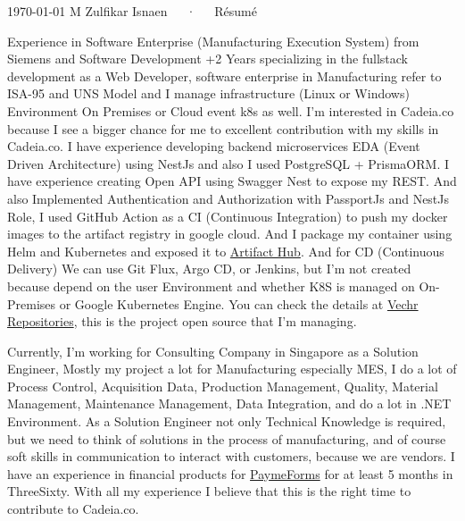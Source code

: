 \documentclass[10pt, a4paper]{awesome-cv}
\begin{document}
\makecvheader[R]

\makecvfooter
  {\today}
  {M Zulfikar Isnaen~~~·~~~Résumé}
  {}

\makelettertitle

\begin{cvletter}

Experience in Software Enterprise (Manufacturing Execution System) from Siemens and Software Development +2 Years specializing in the fullstack development as a Web Developer, software enterprise in Manufacturing refer to ISA-95 and UNS Model and I manage infrastructure (Linux or Windows) Environment On Premises or Cloud event k8s as well.
I'm interested in Cadeia.co because I see a bigger chance for me to excellent contribution with my skills in Cadeia.co. I have experience developing backend microservices EDA (Event Driven Architecture) using NestJs and also I used PostgreSQL + PrismaORM. I have experience creating Open API using Swagger Nest to expose my REST.
And also Implemented Authentication and Authorization with PassportJs and NestJs Role, I used GitHub Action as a CI (Continuous Integration) to push my docker images to the artifact registry in google cloud. And I package my container using Helm and Kubernetes and exposed it to \href{https://artifacthub.io/packages/helm/vechr/vechr-iiot}{Artifact Hub}.
And for CD (Continuous Delivery) We can use Git Flux, Argo CD, or Jenkins, but I'm not created because depend on the user Environment and whether K8S is managed on On-Premises or Google Kubernetes Engine. You can check the details at \href{https://github.com/orgs/vechr/repositories}{Vechr Repositories}, this is the project open source that I'm managing.

Currently, I'm working for Consulting Company in Singapore as a Solution Engineer, Mostly my project a lot for Manufacturing especially MES, I do a lot of Process Control, Acquisition Data, Production Management, Quality, Material Management, Maintenance Management, Data Integration, and do a lot in .NET Environment. As a Solution Engineer not only Technical Knowledge is required, 
but we need to think of solutions in the process of manufacturing, and of course soft skills in communication to interact with customers, because we are vendors. I have an experience in financial products for \href{https://paymeforms.com/}{PaymeForms}  for at least 5 months in ThreeSixty.
With all my experience I believe that this is the right time to contribute to Cadeia.co.


\end{cvletter}
\end{document}
